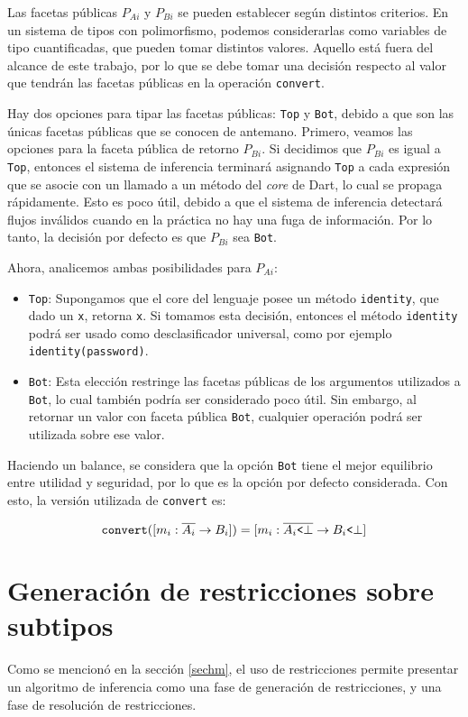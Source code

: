 Las facetas públicas $P_{Ai}$ y $P_{Bi}$ se pueden establecer según distintos criterios. En un sistema de tipos con polimorfismo, podemos considerarlas como variables de tipo cuantificadas, que pueden tomar distintos valores. Aquello está fuera del alcance de este trabajo, por lo que se debe tomar una decisión respecto al valor que tendrán las facetas públicas en la operación \texttt{convert}.

Hay dos opciones para tipar las facetas públicas: \texttt{Top} y \texttt{Bot}, debido a que son las únicas facetas públicas que se conocen de antemano. Primero, veamos las opciones para la faceta pública de retorno $P_{Bi}$. Si decidimos que $P_{Bi}$ es igual a \texttt{Top}, entonces el sistema de inferencia terminará asignando \texttt{Top} a cada expresión que se asocie con un llamado a un método del \emph{core} de Dart, lo cual se propaga rápidamente. Esto es poco útil, debido a que el sistema de inferencia detectará flujos inválidos cuando en la práctica no hay una fuga de información. Por lo tanto, la decisión por defecto es que $P_{Bi}$ sea \texttt{Bot}.

Ahora, analicemos ambas posibilidades para $P_{Ai}$:

\begin{itemize}
  \item \texttt{Top}: Supongamos que el core del lenguaje posee un método \texttt{identity}, que dado un \texttt{x}, retorna \texttt{x}. Si tomamos esta decisión, entonces el método \texttt{identity} podrá ser usado como desclasificador universal, como por ejemplo \texttt{identity(password)}.
  \item \texttt{Bot}: Esta elección restringe las facetas públicas de los argumentos utilizados a \texttt{Bot}, lo cual también podría ser considerado poco útil. Sin embargo, al retornar un valor con faceta pública \texttt{Bot}, cualquier operación podrá ser utilizada sobre ese valor.
\end{itemize}

Haciendo un balance, se considera que la opción \texttt{Bot} tiene el mejor equilibrio entre utilidad y seguridad, por lo que es la opción por defecto considerada. Con esto, la versión utilizada de \texttt{convert} es:

\[
\mathtt{convert}([m_i: \overline{A_i} \rightarrow B_i]) = [m_i: \overline{A_i\text{\texttt{<}}\bot} \rightarrow B_i\text{\texttt{<}}\bot]
\]

\section{Generación de restricciones sobre subtipos} \label{propuestaGen}
Como se mencionó en la sección \ref{sechm}, el uso de restricciones permite presentar un algoritmo de inferencia como una fase de generación de restricciones, y una fase de resolución de restricciones.

